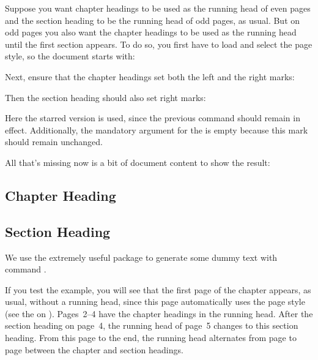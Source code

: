     \begin{Example}
      Suppose you want chapter headings to be used as the running head of even
      pages and the section heading to be the running head of odd pages, as
      usual. But on odd pages you also want the chapter headings to be used as
      the running head until the first section appears. To do so, you first
      have to load 
      and select the  page style,
      so the document starts with:
      Next, ensure that the chapter headings set both the left and the right
      marks:
\begin{lstcode}
\end{lstcode}
      Then the section heading should also set right marks:
\begin{lstcode}
   \automark*[section]{}
\end{lstcode}
      Here the starred version is used, since the previous 
      command should remain in effect. Additionally, the mandatory argument
      for the  is empty because this
      mark should remain unchanged.

      All that's missing now is a bit of document content to show the result:
\begin{lstcode}
  \usepackage{lipsum}
  
  \chapter{Chapter Heading}
  \lipsum[1-20]
  \section{Section Heading}
  \lipsum[21-40]
  
\end{lstcode}
      We use the extremely useful  
      package to generate some dummy text with command 
      .

      If you test the example, you will see that the first page of the chapter 
      appears, as usual, without a running head, since this page automatically 
      uses the  page style
       (see the
       on
      ). Pages~2--4 have the
      chapter headings in the running head. After the section heading on
      page~4, the running head of page~5 changes to this section heading. From
      this page to the end, the running head alternates from page to page
      between the chapter and section headings.%
    \end{Example}
  \fi

